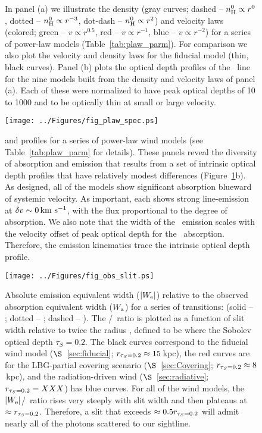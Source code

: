 \documentclass[12pt,preprint]{aastex}
\begin{document}
\begin{figure}
\caption{
In panel (a) we illustrate the density (gray curves; dashed -- $n_{\rm H}^0
\propto r^0$, dotted -- $n_{\rm H}^0 \propto r^{-3}$, dot-dash -- $n_{\rm H}^0
\propto r^{2}$) and velocity laws (colored; green -- $v \propto
r^{0.5}$, red -- $v \propto r^{-1}$, blue -- $v \propto r^{-2}$) for a
series of power-law models (Table~\ref{tab:plaw_parm}).  For
comparison we also plot the velocity and density laws for the fiducial
model (thin, black curves).  
Panel (b) plots the optical depth profiles of the \mgiia\ line for
the nine models built from the density and velocity laws of panel (a).
Each of these were normalized to have peak optical depths of 10 to
1000 and to be optically thin at small or large velocity.
}
\label{fig:plaws}
\end{figure}

\begin{figure}
\texttt{[image: ../Figures/fig\_plaw\_spec.ps]}
\caption{
 and  profiles for a series of power-law wind
models (see Table~\ref{tab:plaw_parm} for details).  These panels reveal
the diversity of absorption and emission that results from a set of
intrinsic optical depth profiles that have relatively modest
differences (Figure~\ref{fig:plaws}b).  As designed, all of the models
show significant absorption blueward of systemic velocity.  As
important, each shows strong line-emission at $\delta v \sim 0 \, {\rm km~s^{-1}}$,
with the flux proportional to the degree of absorption.
We also note that the width of the \feiic\ emission scales with the
velocity offset of peak optical depth for the \feiia\ absorption.
Therefore, the emission kinematics trace the intrinsic
optical depth profile.
}
\label{fig:plaws_spec}
\end{figure}


\begin{figure}
\texttt{[image: ../Figures/fig\_obs\_slit.ps]}
\caption{
Absolute emission equivalent width ($|W_{\rm e}|$) relative to the observed
absorption equivalent width ($W_{\rm a}$) for a series of transitions:
(solid -- \mgiia; dotted -- \mgiib; dashed -- \feiib).  The
\ewe/\ewabs\ ratio is plotted as a function of slit width relative to
twice the radius \rtt, defined to be where the Sobolev optical depth 
$\tau_S = 0.2$.  The black curves correspond to the fiducial wind
model ($\S$~\ref{sec:fiducial}; $r_{\tau_S = 0.2} \approx 15$\,kpc), the red curves are for the
LBG-partial covering scenario ($\S$~\ref{sec:Covering}; $r_{\tau_S = 0.2} \approx
8$\,kpc), and the
radiation-driven wind ($\S$~\ref{sec:radiative}; $r_{\tau_S = 0.2} = XXX$) has blue curves.
For all of the wind models, the $|W_{\rm e}|$/\ewabs\ ratio rises very steeply
with slit width and then plateaus at $\approx r_{\tau_S = 0.2}$.  
Therefore, a slit that exceeds $\approx 0.5 r_{\tau_S = 0.2}$ will admit nearly
all of the photons scattered to our sightline.
}
\label{fig:obs_slit}
\end{figure}
\end{document}
